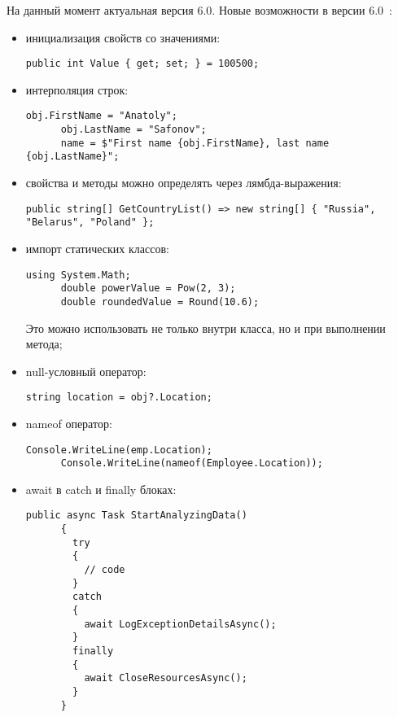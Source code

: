 На данный момент актуальная версия \csharp{} 6.0.
Новые возможности в версии 6.0~\cite{improves_csharp6}:
\begin{itemize}
  \item инициализация свойств со значениями:
    \begin{lstlisting}[style=csharpinlinestyle]
      public int Value { get; set; } = 100500;
    \end{lstlisting}
  \item интерполяция строк:
    \begin{lstlisting}[style=csharpinlinestyle]
      obj.FirstName = "Anatoly";
      obj.LastName = "Safonov";
      name = $"First name {obj.FirstName}, last name {obj.LastName}";
    \end{lstlisting}
  \item свойства и методы можно определять через лямбда-выражения:
    \begin{lstlisting}[style=csharpinlinestyle]
      public string[] GetCountryList() => new string[] { "Russia", "Belarus", "Poland" };
    \end{lstlisting}
  \item импорт статических классов:
    \begin{lstlisting}[style=csharpinlinestyle]
      using System.Math;
      double powerValue = Pow(2, 3);
      double roundedValue = Round(10.6);
    \end{lstlisting}
    Это можно использовать не только внутри класса, но и при выполнении метода;
  \item null-условный оператор:
    \begin{lstlisting}[style=csharpinlinestyle]
      string location = obj?.Location;
    \end{lstlisting}
  \item nameof оператор:
    \begin{lstlisting}[style=csharpinlinestyle]
      Console.WriteLine(emp.Location);
      Console.WriteLine(nameof(Employee.Location));
    \end{lstlisting}
  \item await в catch и finally блоках:
    \begin{lstlisting}[style=csharpinlinestyle]
      public async Task StartAnalyzingData()
      {
        try
        {
          // code
        }
        catch
        {
          await LogExceptionDetailsAsync();
        }
        finally
        {
          await CloseResourcesAsync();
        }
      }
    \end{lstlisting}

\end{itemize}
